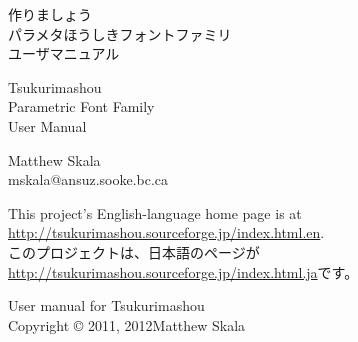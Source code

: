 \documentclass[14pt]{extarticle}
\begin{document}
\pagestyle{plain}\thispagestyle{empty}


\kaku
\begin{center}\LARGE

\vspace*{\fill}


{\Huge 作りましょう~\TsukurimashouVWide}\\
{\huge パラメタほうしきフォントファミリ\\
ユーザマニュアル}

\vspace*{0.75in}

{\Huge Tsukurimashou~\TsukurimashouVersion}\\
{\huge Parametric Font Family\\
User Manual}

\vspace*{1.5in}

Matthew Skala\\
mskala@ansuz.sooke.bc.ca\\
\TsukurimashouRDWide\qquad\TsukurimashouReleaseDate

\vspace*{\fill}

\end{center}
\clearpage


\vspace*{\fill}


This project's English-language home page is at\\
\hspace*{1em}\url{http://tsukurimashou.sourceforge.jp/index.html.en}.\\
このプロジェクトは、日本語のページが\\
\hspace*{1em}\url{http://tsukurimashou.sourceforge.jp/index.html.ja}です。

\vspace*{1in}

User manual for Tsukurimashou\\
Copyright © 2011, 2012\quad Matthew Skala
\end{document}
